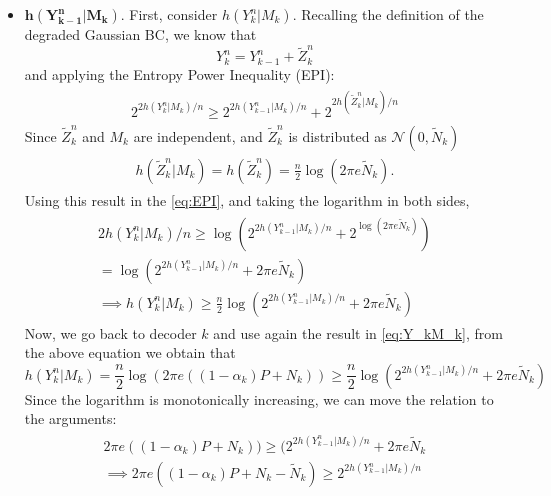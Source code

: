 \begin{itemize}
  \item $\mathbf{h(Y_{k-1}^n|M_{k})}$. First, consider $h(Y_k^n|M_k)$. Recalling the definition of the degraded Gaussian BC, we know that
  \begin{equation}
      Y^n_k = Y^n_{k-1}+\tilde{Z}^n_k
  \end{equation}
  and applying the Entropy Power Inequality (EPI):
  \begin{align}
    \begin{split}
      2^{2h(Y^n_k|M_k)/n}\geq 2^{2h(Y^n_{k-1}|M_k)/n}+2^{2h(\tilde{Z}^n_{k}|M_k)/n}
    \end{split}
    \label{eq:EPI}
  \end{align}
  Since $\tilde{Z}^n_k$ and $M_k$ are independent, and $\tilde{Z}^n_k$ is distributed as $\mathcal{N}(0,\tilde{N}_k)$
  \begin{align}
    \begin{split}
      h(\tilde{Z}^n_{k}|M_k) = h(\tilde{Z}^n_{k}) = \frac{n}{2}\log\left(2\pi e \tilde{N}_k\right).
    \end{split}
  \end{align}
  Using this result in the \ref{eq:EPI}, and taking the logarithm in both sides,
  \begin{align}
    \begin{split}
      2h(Y^n_k|M_k)/n\geq \log\left(2^{2h(Y^n_{k-1}|M_k)/n}+2^{\log\left(2\pi e \tilde{N}_k\right)}\right) \\
      = \log\left(2^{2h(Y^n_{k-1}|M_k)/n}+2\pi e \tilde{N}_k\right)\\
      \implies h(Y^n_k|M_k)\geq \frac{n}{2}\log\left(2^{2h(Y^n_{k-1}|M_k)/n}+2\pi e \tilde{N}_k\right)
    \end{split}
  \end{align}
  Now, we go back to decoder $k$ and use again the result in \ref{eq:Y_kM_k}, from the above equation we obtain that
  \begin{equation}
    h(Y_k^n|M_k) = \frac{n}{2}\log(2\pi e ((1-\alpha_k) P+N_k))\geq \frac{n}{2}\log\left(2^{2h(Y^n_{k-1}|M_k)/n}+2\pi e \tilde{N}_k\right)
  \end{equation}
  Since the logarithm is monotonically increasing, we can move the relation to the arguments:
  \begin{align}
    \begin{split}
      2\pi e ((1-\alpha_k) P+N_k))\geq (2^{2h(Y^n_{k-1}|M_k)/n}+2\pi e \tilde{N}_k\\
      \implies
      2\pi e ((1-\alpha_k) P+N_k-\tilde{N}_k)\geq 2^{2h(Y^n_{k-1}|M_k)/n}\\

\end{split}
\end{align}
\end{itemize}
